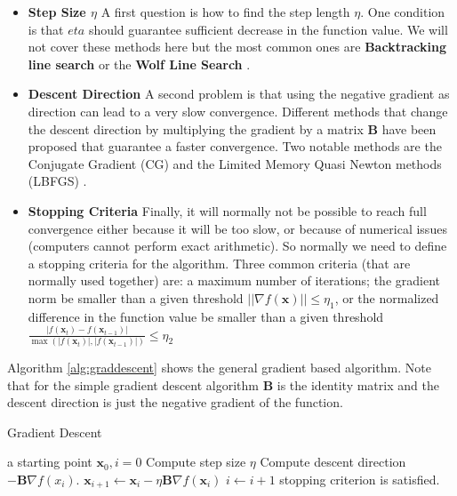 \begin{itemize}
\item \textbf{Step Size $\eta$} A first question is how to find the step length $\eta$. One condition is that $eta$ should guarantee sufficient decrease in the function value. We will not cover these methods here but the most common ones are \textbf{Backtracking line search} or the \textbf{Wolf Line Search} \citep{Nocedal1999}.
\item \textbf{Descent Direction}  A second problem is that using the negative gradient as direction can lead to a very slow convergence. Different methods that change the descent direction by multiplying the gradient by a matrix $\textbf{B}$ have been proposed that guarantee a faster convergence. Two notable methods are the Conjugate Gradient (CG) and the Limited Memory Quasi Newton methods (LBFGS) \citep{Nocedal1999}.
\item \textbf{Stopping Criteria} Finally, it will normally not be possible to reach full convergence either because it will be too slow, or because of numerical issues (computers cannot perform exact arithmetic). So normally we need to define a stopping criteria for the algorithm. Three common criteria (that are normally used together) are: a maximum number of iterations; the gradient norm be smaller than a given threshold   $||\nabla f(\textbf{x})|| \leq \eta_1$, or the normalized difference in the function value be smaller than a given threshold $\frac{|f(\textbf{x}_t) - f(\textbf{x}_{t-1})|}{\max(|f(\textbf{x}_t)|,|f(\textbf{x}_{t-1})|)} \leq \eta_2$
\end{itemize}

Algorithm \ref{alg:graddescent} shows the general gradient based algorithm. Note that for the simple gradient descent algorithm $\textbf{B}$ is the identity matrix and the descent direction is just the negative gradient of the function. %

\begin{algorithm}[h]
\caption{Gradient Descent\label{alg:graddescent}}
\begin{algorithmic}[1]
 a starting point $\textbf{x}_{0}, i=0$
\STATE \quad Compute step size $\eta$
\STATE \quad Compute descent direction $- \textbf{B}\nabla f(x_{i})$.
\STATE \quad $\textbf{x}_{i+1} \leftarrow \textbf{x}_{i} - \eta\textbf{B}\nabla f(\textbf{x}_{i})$
\STATE \quad $i \leftarrow i + 1$
 stopping criterion is satisfied.
\end{algorithmic}
\end{algorithm}

